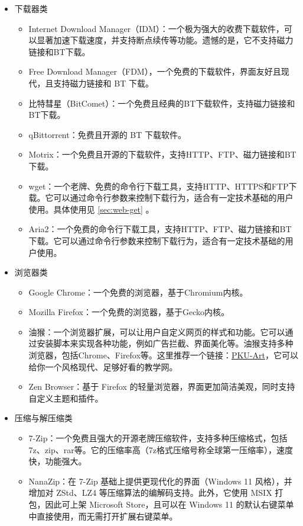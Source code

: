\begin{itemize}
  \item 下载器类
    \begin{itemize}
      \item Internet Download Manager（IDM）：一个极为强大的收费下载软件，可以显著加速下载速度，并支持断点续传等功能。遗憾的是，它不支持磁力链接和BT下载。
      \item Free Download Manager（FDM），一个免费的下载软件，界面友好且现代，且支持磁力链接和 BT 下载。
      \item 比特彗星（BitComet）：一个免费且经典的BT下载软件，支持磁力链接和BT下载。
      \item qBittorrent：免费且开源的 BT 下载软件。
      \item Motrix：一个免费且开源的下载软件，支持HTTP、FTP、磁力链接和BT下载。
      \item wget：一个老牌、免费的命令行下载工具，支持HTTP、HTTPS和FTP下载。它可以通过命令行参数来控制下载行为，适合有一定技术基础的用户使用。具体使用见 \ref{sec:web-get} 。
      \item Aria2：一个免费的命令行下载工具，支持HTTP、FTP、磁力链接和BT下载。它可以通过命令行参数来控制下载行为，适合有一定技术基础的用户使用。
    \end{itemize}
  \item 浏览器类
    \begin{itemize}
      \item Google Chrome：一个免费的浏览器，基于Chromium内核。
      \item Mozilla Firefox：一个免费的浏览器，基于Gecko内核。
      \item 油猴：一个浏览器扩展，可以让用户自定义网页的样式和功能。它可以通过安装脚本来实现各种功能，例如广告拦截、界面美化等。油猴支持多种浏览器，包括Chrome、Firefox等。这里推荐一个链接：\href{https://github.com/zhuozhiyongde/PKU-Art}{PKU-Art}，它可以给你一个风格现代、足够好看的教学网。
      \item Zen Browser：基于 Firefox 的轻量浏览器，界面更加简洁美观，同时支持自定义主题和插件。
    \end{itemize}
  \item 压缩与解压缩类
    \begin{itemize}
      \item 7-Zip：一个免费且强大的开源老牌压缩软件，支持多种压缩格式，包括7z、zip、rar等。它的压缩率高（7z格式压缩号称全球第一压缩率），速度快，功能强大。
      \item NanaZip：在 7-Zip 基础上提供更现代化的界面（Windows 11 风格），并增加对 ZStd、LZ4 等压缩算法的编解码支持。此外，它使用 MSIX 打包，因此可上架 Microsoft Store，且可以在 Windows 11 的默认右键菜单中直接使用，而无需打开扩展右键菜单。

\end{itemize}
\end{itemize}
